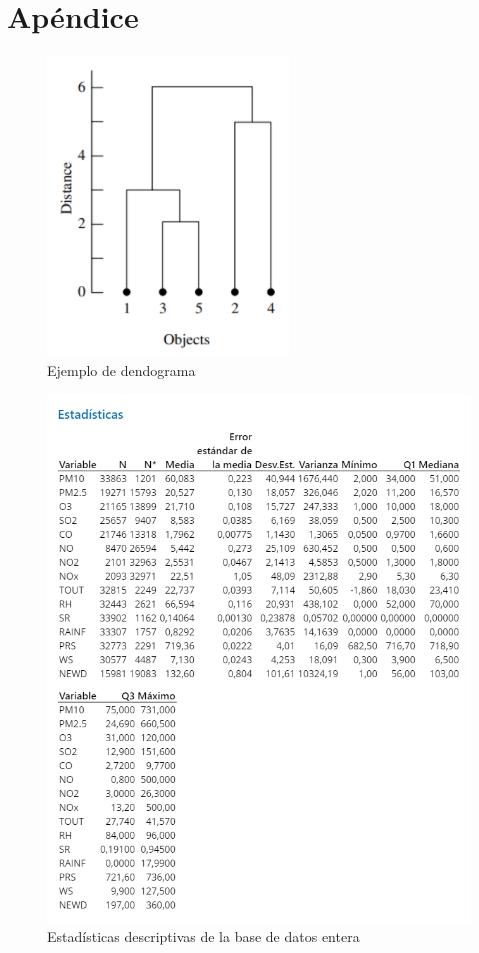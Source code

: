 \documentclass[journal, 10pt]{IEEEtran}                                                          %
\begin{document}



\section{Apéndice}
\begin{figure}[H]
    \centering
    \includegraphics[scale=0.5]{dendograma.png}
    \caption{Ejemplo de dendograma}
    \label{fig:dendoGen}
\end{figure}


\begin{figure}[H]
    \centering
    \includegraphics[scale=.3]{descriptivaTotal.png}
    \caption{Estadísticas descriptivas de la base de datos entera}
    \label{fig:descriptiva}
\end{figure}
\end{document}
